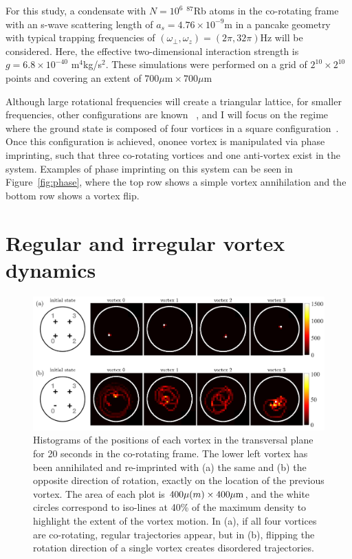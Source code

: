 For this study, a condensate with $N = 10^6$ $^{87}$Rb atoms in the co-rotating frame with an s-wave scattering length of $a_s=4.76\times 10^{-9}$m in a pancake geometry with typical trapping frequencies of $(\omega_\perp, \omega_z) = (2\pi, 32\pi)$Hz will be considered.
Here, the effective two-dimensional interaction strength is $g = 6.8\times 10^{-40}$ m$^4$kg/s$^2$.
These simulations were performed on a grid of $2^{10} \times 2^{10}$ points and covering an extent of $700\mu \text{m} \times 700 \mu \text{m}$

Although large rotational frequencies will create a triangular lattice, for smaller frequencies, other configurations are known ~\cite{aftalion2001}, and I will focus on the regime where the ground state is composed of four vortices in a square configuration~\cite{zampetaki2013}.
Once this configuration is achieved, ononee vortex is manipulated via phase imprinting, such that three co-rotating vortices and one anti-vortex exist in the system.
Examples of phase imprinting on this system can be seen in Figure~\ref{fig:phase}, where the top row shows a simple vortex annihilation and the bottom row shows a vortex flip.

\section{Regular and irregular vortex dynamics}

\begin{figure}
\includegraphics[width=\textwidth]{data/2d/histogram/histogram}

\caption{
Histograms of the positions of each vortex in the transversal plane for 20 seconds in the co-rotating frame.
The lower left vortex has been annihilated and re-imprinted with (a) the same and (b) the opposite direction of rotation, exactly on the location of the previous vortex.
The area of each plot is $400\mu \text(m) \times 400 \mu \text{m}$, and the white circles correspond to iso-lines at 40\% of the maximum density to highlight the extent of the vortex motion.
In (a), if all four vortices are co-rotating, regular trajectories appear, but in (b), flipping the rotation direction of a single vortex creates disordered trajectories.
}
\label{fig:histogram}
\end{figure}

